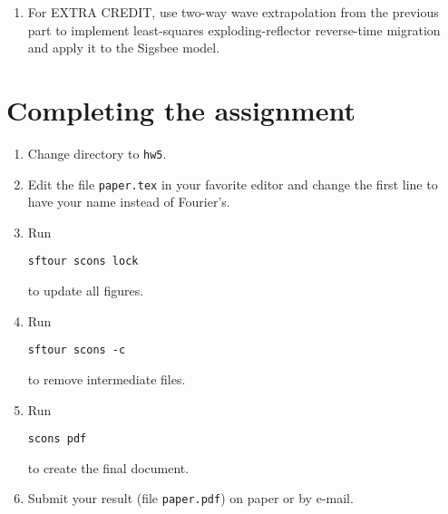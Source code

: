 \begin{enumerate}
\begin{enumerate}
\item For EXTRA CREDIT, use two-way wave extrapolation from the
  previous part to implement least-squares exploding-reflector
  reverse-time migration and apply it to the Sigsbee model.
  
\end{enumerate}

\end{enumerate}


\section{Completing the assignment}

\begin{enumerate}
\item Change directory to \texttt{hw5}.
\item Edit the file \texttt{paper.tex} in your favorite editor and change the first line to have your name instead of Fourier's.
\item Run
\begin{verbatim}
sftour scons lock
\end{verbatim}
to update all figures.
\item Run
\begin{verbatim}
sftour scons -c
\end{verbatim}
to remove intermediate files.
\item Run
\begin{verbatim} 
scons pdf
\end{verbatim}
to create the final document.
\item Submit your result (file \texttt{paper.pdf}) on paper or by
  e-mail. 
\end{enumerate}


